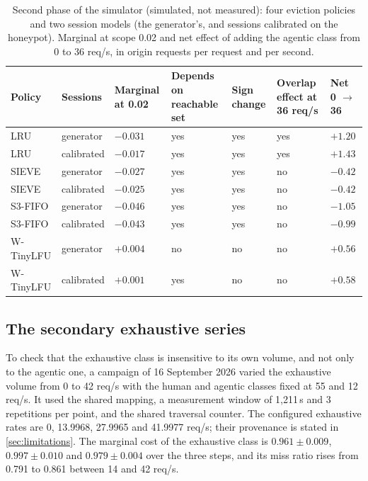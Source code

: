 \begin{table}[h]
\caption{Second phase of the simulator (simulated, not measured): four eviction policies
and two session models (the generator's, and sessions calibrated on the honeypot). Marginal
at scope 0.02 and net effect of adding the agentic class from 0 to 36 req/s, in origin
requests per request and per second.}
\label{tab:sim}
\centering\scriptsize
\begin{tabularx}{\textwidth}{@{}ll>{\raggedleft\arraybackslash}X>{\centering\arraybackslash}X>{\centering\arraybackslash}X>{\centering\arraybackslash}X>{\raggedleft\arraybackslash}X@{}}
\toprule
Policy & Sessions & Marginal at 0.02 & Depends on reachable set & Sign change & Overlap effect at 36 req/s & Net 0 $\to$ 36 \\
\midrule
LRU       & generator  & $-0.031$ & yes & yes & yes & $+1.20$ \\
LRU       & calibrated & $-0.017$ & yes & yes & yes & $+1.43$ \\
SIEVE     & generator  & $-0.027$ & yes & yes & no  & $-0.42$ \\
SIEVE     & calibrated & $-0.025$ & yes & yes & no  & $-0.42$ \\
S3-FIFO   & generator  & $-0.046$ & yes & yes & no  & $-1.05$ \\
S3-FIFO   & calibrated & $-0.043$ & yes & yes & no  & $-0.99$ \\
W-TinyLFU & generator  & $+0.004$ & no  & no  & no  & $+0.56$ \\
W-TinyLFU & calibrated & $+0.001$ & yes & no  & no  & $+0.58$ \\
\bottomrule
\end{tabularx}
\end{table}

\subsection{The secondary exhaustive series}\label{app:a7}
To check that the exhaustive class is insensitive to its own volume, and not only to the
agentic one, a campaign of 16 September 2026 varied the exhaustive volume from 0 to 42 req/s
with the human and agentic classes fixed at 55 and 12 req/s.
It used the shared mapping, a measurement window of 1,211\,s and 3 repetitions per point,
and the shared traversal counter.
The configured exhaustive rates are 0, 13.9968, 27.9965 and 41.9977 req/s; their provenance
is stated in \cref{sec:limitations}.
The marginal cost of the exhaustive class is $0.961 \pm 0.009$, $0.997 \pm 0.010$ and
$0.979 \pm 0.004$ over the three steps, and its miss ratio rises from 0.791 to 0.861
between 14 and 42 req/s.

